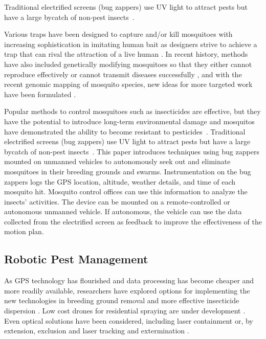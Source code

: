\documentclass[letterpaper, 10 pt, conference]{ieeeconf}  %
\begin{document}
Traditional electrified screens (bug zappers) use UV light to attract pests but have a large bycatch of non-pest insects~\cite{University-Of-Florida1997}. 

	Various traps have been designed to capture and/or kill mosquitoes with increasing sophistication in imitating human bait as designers strive to achieve a trap that can rival the attraction of a live human \cite{maliti2015development}.  In recent history, methods have also included genetically modifying mosquitoes so that they either cannot reproduce effectively or cannot transmit diseases successfully \cite{marshall2009malaria}, and with the recent genomic mapping of mosquito species, new ideas for more targeted work have been formulated \cite{hill2005arthropod}.
	
	Popular methods to control mosquitoes such as insecticides are effective, but they have the potential to introduce long-term environmental damage and mosquitos have demonstrated the ability to become resistant to pesticides~\cite{ndiath2012resistance}. Traditional electrified screens (bug zappers) use UV light to attract pests but have a large bycatch of non-pest insects~\cite{University-Of-Florida1997}. This paper introduces techniques using bug zappers mounted on unmanned vehicles to autonomously seek out and eliminate mosquitoes in their breeding grounds and swarms. Instrumentation on the bug zappers logs the GPS location, altitude, weather details, and time of each mosquito hit.  Mosquito control offices can use this information to analyze the insects' activities. The device can be mounted on a remote-controlled or autonomous unmanned vehicle. If autonomous, the vehicle can use the data collected from the electrified screen as feedback to improve the effectiveness of the motion plan. 
	
 
    \subsection{Robotic Pest Management}
    
As GPS technology has flourished and data processing has become cheaper and more readily available, researchers have explored options for implementing the new technologies in breeding ground removal \cite{anupa2014identification} and more effective insecticide dispersion \cite{hur2015low}.  Low cost drones for residential spraying are under development \cite{amenyo2014medizdroids}.  Even optical solutions have been considered, including laser containment \cite{boonsri2012laser} or, by extension, exclusion and laser tracking and extermination \cite{kare2010build}.
    
\end{document}
